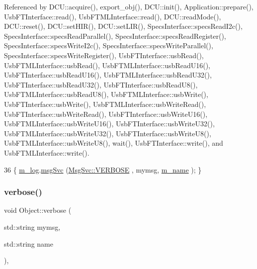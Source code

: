 Referenced by D\+C\+U\+::acquire(), export\+\_\+obj(), D\+C\+U\+::init(), Application\+::prepare(), Usb\+F\+T\+Interface\+::read(), Usb\+F\+T\+M\+L\+Interface\+::read(), D\+C\+U\+::read\+Mode(), D\+C\+U\+::reset(), D\+C\+U\+::set\+H\+I\+R(), D\+C\+U\+::set\+L\+I\+R(), Specs\+Interface\+::specs\+Read\+I2c(), Specs\+Interface\+::specs\+Read\+Parallel(), Specs\+Interface\+::specs\+Read\+Register(), Specs\+Interface\+::specs\+Write\+I2c(), Specs\+Interface\+::specs\+Write\+Parallel(), Specs\+Interface\+::specs\+Write\+Register(), Usb\+F\+T\+Interface\+::usb\+Read(), Usb\+F\+T\+M\+L\+Interface\+::usb\+Read(), Usb\+F\+T\+M\+L\+Interface\+::usb\+Read\+U16(), Usb\+F\+T\+Interface\+::usb\+Read\+U16(), Usb\+F\+T\+M\+L\+Interface\+::usb\+Read\+U32(), Usb\+F\+T\+Interface\+::usb\+Read\+U32(), Usb\+F\+T\+Interface\+::usb\+Read\+U8(), Usb\+F\+T\+M\+L\+Interface\+::usb\+Read\+U8(), Usb\+F\+T\+M\+L\+Interface\+::usb\+Write(), Usb\+F\+T\+Interface\+::usb\+Write(), Usb\+F\+T\+M\+L\+Interface\+::usb\+Write\+Read(), Usb\+F\+T\+Interface\+::usb\+Write\+Read(), Usb\+F\+T\+Interface\+::usb\+Write\+U16(), Usb\+F\+T\+M\+L\+Interface\+::usb\+Write\+U16(), Usb\+F\+T\+Interface\+::usb\+Write\+U32(), Usb\+F\+T\+M\+L\+Interface\+::usb\+Write\+U32(), Usb\+F\+T\+Interface\+::usb\+Write\+U8(), Usb\+F\+T\+M\+L\+Interface\+::usb\+Write\+U8(), wait(), Usb\+F\+T\+Interface\+::write(), and Usb\+F\+T\+M\+L\+Interface\+::write().


\begin{DoxyCode}
36 \{ \hyperlink{classObject_a0d269813dd7ac1f24bc143031e2963f2}{m\_log}.\hyperlink{classMsgSvc_ad25f18047920cc59a314e5098259711c}{msgSvc} (\hyperlink{classMsgSvc_ae671eb7301996cd049d2da8a65925926af655256b06494ade5ba830abe5401ec9}{MsgSvc::VERBOSE} , mymsg, \hyperlink{classObject_a8b83c95c705d2c3ba0d081fe1710f48d}{m\_name} ); \}
\end{DoxyCode}
\mbox{\label{classObject_a2d4120195317e2a3c6532e8bb9f3da68}} 
\subsubsection{\texorpdfstring{verbose()}{verbose()}\hspace{0.1cm}{\footnotesize\ttfamily [2/2]}}
{\footnotesize\ttfamily void Object\+::verbose (\begin{DoxyParamCaption}\item[{std\+::string}]{mymsg,  }\item[{std\+::string}]{name }\end{DoxyParamCaption})\hspace{0.3cm}{\ttfamily [inline]}, {\ttfamily [inherited]}}



